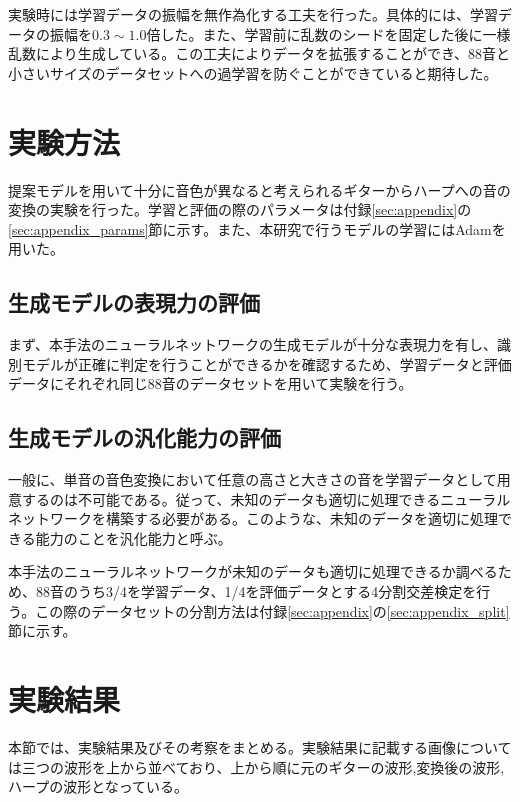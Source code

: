 実験時には学習データの振幅を無作為化する工夫を行った。具体的には、学習データの振幅を$0.3\sim1.0$倍した。また、学習前に乱数のシードを固定した後に一様乱数により生成している。この工夫によりデータを拡張することができ、88音と小さいサイズのデータセットへの過学習を防ぐことができていると期待した。

\section{実験方法}

提案モデルを用いて十分に音色が異なると考えられるギターからハープへの音の変換の実験を行った。学習と評価の際のパラメータは付録\ref{sec:appendix}の\ref{sec:appendix_params}節に示す。また、本研究で行うモデルの学習にはAdamを用いた。

\subsection{生成モデルの表現力の評価}

まず、本手法のニューラルネットワークの生成モデルが十分な表現力を有し、識別モデルが正確に判定を行うことができるかを確認するため、学習データと評価データにそれぞれ同じ88音のデータセットを用いて実験を行う。

\subsection{生成モデルの汎化能力の評価}

一般に、単音の音色変換において任意の高さと大きさの音を学習データとして用意するのは不可能である。従って、未知のデータも適切に処理できるニューラルネットワークを構築する必要がある。このような、未知のデータを適切に処理できる能力のことを汎化能力と呼ぶ。

本手法のニューラルネットワークが未知のデータも適切に処理できるか調べるため、88音のうち3/4を学習データ、1/4を評価データとする4分割交差検定を行う。この際のデータセットの分割方法は付録\ref{sec:appendix}の\ref{sec:appendix_split}節に示す。

\section{実験結果}

本節では、実験結果及びその考察をまとめる。実験結果に記載する画像については三つの波形を上から並べており、上から順に元のギターの波形,変換後の波形,ハープの波形となっている。


